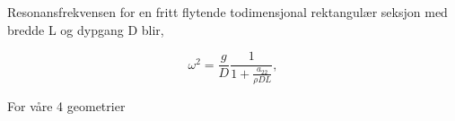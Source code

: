 Resonansfrekvensen for en fritt flytende todimensjonal rektangulær seksjon med bredde L og dypgang D blir, 

\begin{equation}
\omega^2 = \frac{g}{D}  \frac{1}{1 + \frac{a_{22}}{\rho DL}}, 
\end{equation}

For våre 4 geometrier